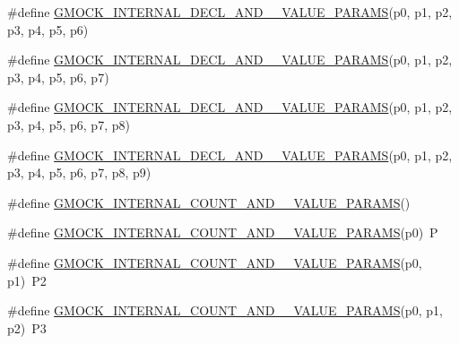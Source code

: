 \begin{DoxyCompactItemize}
\item 
\#define \mbox{\hyperlink{googletest-master_2googlemock_2include_2gmock_2gmock-generated-actions_8h_af762ce6b60357100fd2c8176ef2f4102}{G\+M\+O\+C\+K\+\_\+\+I\+N\+T\+E\+R\+N\+A\+L\+\_\+\+D\+E\+C\+L\+\_\+\+A\+N\+D\+\_\+\_\+\+V\+A\+L\+U\+E\+\_\+\+P\+A\+R\+A\+MS}}(p0,  p1,  p2,  p3,  p4,  p5,  p6)
\item 
\#define \mbox{\hyperlink{googletest-master_2googlemock_2include_2gmock_2gmock-generated-actions_8h_a3ce778c4907edf2818c948a78a94760a}{G\+M\+O\+C\+K\+\_\+\+I\+N\+T\+E\+R\+N\+A\+L\+\_\+\+D\+E\+C\+L\+\_\+\+A\+N\+D\+\_\+\_\+\+V\+A\+L\+U\+E\+\_\+\+P\+A\+R\+A\+MS}}(p0,  p1,  p2,  p3,  p4,  p5,  p6,  p7)
\item 
\#define \mbox{\hyperlink{googletest-master_2googlemock_2include_2gmock_2gmock-generated-actions_8h_a94ebf056f6c78d158bf16eec04583dd0}{G\+M\+O\+C\+K\+\_\+\+I\+N\+T\+E\+R\+N\+A\+L\+\_\+\+D\+E\+C\+L\+\_\+\+A\+N\+D\+\_\+\_\+\+V\+A\+L\+U\+E\+\_\+\+P\+A\+R\+A\+MS}}(p0,  p1,  p2,  p3,  p4,  p5,  p6,  p7,  p8)
\item 
\#define \mbox{\hyperlink{googletest-master_2googlemock_2include_2gmock_2gmock-generated-actions_8h_a125c9b0d293f0e900ff37ce42b8ed217}{G\+M\+O\+C\+K\+\_\+\+I\+N\+T\+E\+R\+N\+A\+L\+\_\+\+D\+E\+C\+L\+\_\+\+A\+N\+D\+\_\+\_\+\+V\+A\+L\+U\+E\+\_\+\+P\+A\+R\+A\+MS}}(p0,  p1,  p2,  p3,  p4,  p5,  p6,  p7,  p8,  p9)
\item 
\#define \mbox{\hyperlink{googletest-master_2googlemock_2include_2gmock_2gmock-generated-actions_8h_a4876365f0389f3cd8021f650d095be55}{G\+M\+O\+C\+K\+\_\+\+I\+N\+T\+E\+R\+N\+A\+L\+\_\+\+C\+O\+U\+N\+T\+\_\+\+A\+N\+D\+\_\+\_\+\+V\+A\+L\+U\+E\+\_\+\+P\+A\+R\+A\+MS}}()
\item 
\#define \mbox{\hyperlink{googletest-master_2googlemock_2include_2gmock_2gmock-generated-actions_8h_a372a4dbbfeba17c2af89aa1027cb7f67}{G\+M\+O\+C\+K\+\_\+\+I\+N\+T\+E\+R\+N\+A\+L\+\_\+\+C\+O\+U\+N\+T\+\_\+\+A\+N\+D\+\_\+\_\+\+V\+A\+L\+U\+E\+\_\+\+P\+A\+R\+A\+MS}}(p0)~P
\item 
\#define \mbox{\hyperlink{googletest-master_2googlemock_2include_2gmock_2gmock-generated-actions_8h_a58ef57d40fec061e17fdcbf020b77e20}{G\+M\+O\+C\+K\+\_\+\+I\+N\+T\+E\+R\+N\+A\+L\+\_\+\+C\+O\+U\+N\+T\+\_\+\+A\+N\+D\+\_\+\_\+\+V\+A\+L\+U\+E\+\_\+\+P\+A\+R\+A\+MS}}(p0,  p1)~P2
\item 
\#define \mbox{\hyperlink{googletest-master_2googlemock_2include_2gmock_2gmock-generated-actions_8h_a43c845e4e60b3e17c4e312bbc5a8bb66}{G\+M\+O\+C\+K\+\_\+\+I\+N\+T\+E\+R\+N\+A\+L\+\_\+\+C\+O\+U\+N\+T\+\_\+\+A\+N\+D\+\_\+\_\+\+V\+A\+L\+U\+E\+\_\+\+P\+A\+R\+A\+MS}}(p0,  p1,  p2)~P3

\end{DoxyCompactItemize}
